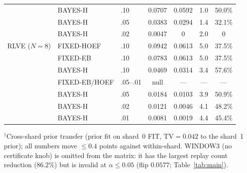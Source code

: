 \documentclass{article}
\theoremstyle{definition}
\theoremstyle{remark}
\begin{document}
\begin{table}[h]
\begin{tabular}{lllcccc}
                    & BAYES-H    & .10 & 0.0707 & 0.0592 & 1.0 & 50.0\% \\
                    & BAYES-H    & .05 & 0.0383 & 0.0294 & 1.4 & 32.1\% \\
                    & BAYES-H    & .02 & 0.0047 & 0 & 2.0 & 0 \\
\midrule
RLVE ($N{=}8$)      & FIXED-HOEF & .10 & 0.0942 & 0.0613 & 5.0 & 37.5\% \\
                    & FIXED-EB   & .10 & 0.0783 & 0.0613 & 5.0 & 37.5\% \\
                    & BAYES-H    & .10 & 0.0469 & 0.0314 & 3.4 & 57.6\% \\
                    & FIXED-EB/HOEF & .05--.01 & null & --- & --- & --- \\
                    & BAYES-H    & .05 & 0.0184 & 0.0103 & 3.9 & 50.9\% \\
                    & BAYES-H    & .02 & 0.0121 & 0.0046 & 4.1 & 48.2\% \\
                    & BAYES-H    & .01 & 0.0081 & 0.0019 & 4.4 & 45.4\% \\
\bottomrule
\end{tabular}
\vspace{2pt}
\begin{minipage}{\linewidth}\footnotesize
$^\dagger$Cross-shard prior transfer (prior fit on shard~0 FIT,
$\mathrm{TV}{=}0.042$ to the shard~1 prior); all numbers move ${\le}0.4$
points against within-shard. WINDOW3 (no certificate knob) is omitted from
the matrix: it has the largest replay count reduction ($86.2\%$) but is invalid at $\alpha\le0.05$
(flip $0.0577$; Table~\ref{tab:main}).
\end{minipage}
\end{table}
\end{document}
